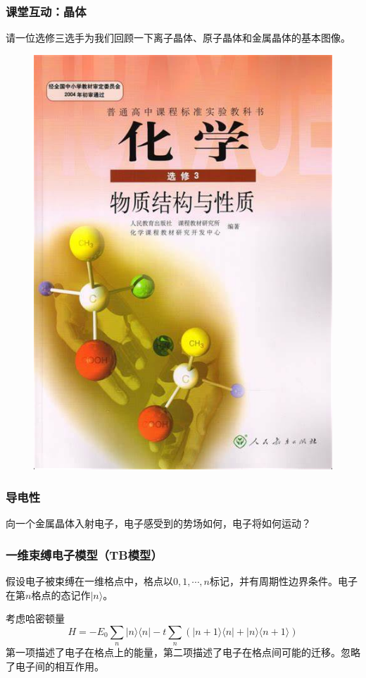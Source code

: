 \documentclass[CJK]{beamer}
\begin{document}
\begin{frame}
\frametitle{\bch 课堂互动：晶体 \ech}
\bch
请一位选修三选手为我们回顾一下离子晶体、原子晶体和金属晶体的基本图像。
\begin{figure}[h!]
\includegraphics[scale=0.214]{chem3}

\end{figure}
\ech
\end{frame}

\begin{frame}
\frametitle{\bch 导电性 \ech}
\bch
向一个金属晶体入射电子，电子感受到的势场如何，电子将如何运动？
\ech
\end{frame}

\begin{frame}
\frametitle{\bch 一维束缚电子模型（TB模型） \ech}
\bch
假设电子被束缚在一维格点中，格点以$0,1,\cdots,n$标记，并有周期性边界条件。电子在第$n$格点的态记作$|n\rangle$。
\par
考虑哈密顿量
$$
H = -E_0 \sum_n |n \rangle \langle n | - t \sum_n \left( |n+1 \rangle \langle n | + |n\rangle \langle n+1 \rangle \right)
$$
第一项描述了电子在格点上的能量，第二项描述了电子在格点间可能的迁移。忽略了电子间的相互作用。
\ech
\end{frame}
\end{document}
